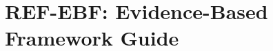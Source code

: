 %
%
%

%
%
%
%

\chapter{REF-EBF: Evidence-Based Framework Guide}
\label{app:ref-ebf}

\begin{abstract}
This appendix explains what the Evidence-Based Framework (EBF) is, how it
differs from traditional AI/LLM systems, and how to use it effectively.
EBF is a behavioral-architecture system that models human behavior based on
50+ years of validated research, not a chatbot that generates language.
\end{abstract}


